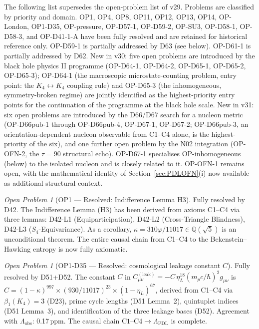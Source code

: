 \documentclass[11pt,a4paper]{article}
\theoremstyle{plain}
\theoremstyle{definition}
\theoremstyle{remark}
\newtheorem{openproblem}[theorem]{Open Problem}
\begin{document}
The following list supersedes the open-problem list of v29. Problems are classified by priority and domain. OP1, OP4, OP8, OP11, OP12, OP13, OP14, OP-London, OP1-D35, OP-pressure, OP-D57-1, OP-D59-2, OP-SU3, OP-D58-1, OP-D58-3, and OP-D41-1-A have been fully resolved and are retained for historical reference only. OP-D59-1 is partially addressed by D63 (see below). OP-D61-1 is partially addressed by D62. New in v30: five open problems are introduced by the black hole physics II programme (OP-D64-1, OP-D64-2, OP-D65-1, OP-D65-2, OP-D65-3); OP-D64-1 (the macroscopic microstate-counting problem, entry point: the $K_4\leftrightarrow K_4$ coupling rule) and OP-D65-3 (the inhomogeneous, symmetry-broken regime) are jointly identified as the highest-priority entry points for the continuation of the programme at the black hole scale. New in v31: six open problems are introduced by the D66/D67 search for a nucleon metric (OP-D66pub-1 through OP-D66pub-4, OP-D67-1, OP-D67-2; OP-D66pub-3, an orientation-dependent nucleon observable from C1--C4 alone, is the highest-priority of the six), and one further open problem by the N02 integration (OP-OFN-2, the $\tau=90$ structural echo). OP-D67-1 specialises OP-inhomogeneous (below) to the isolated nucleon and is closely related to it. OP-OFN-1 remains open, with the mathematical identity of Section~\ref{sec:PDLOFN}(i) now available as additional structural context.

\begin{openproblem}[OP1 --- Resolved: Indifference Lemma H3]
\label{op:H3}
\textcolor{proofblue}{Fully resolved by D42.} The Indifference Lemma (H3) has been derived from axioms C1--C4 via three lemmas: D42-L1 (Equiparticipation), D42-L2 (Cross-Triangle Blindness), D42-L3 ($S_4$-Equivariance). As a corollary, $\kappa=310\varphi/11017\in\mathbb{Q}(\sqrt{5})$ is an unconditional theorem. The entire causal chain from C1--C4 to the Bekenstein--Hawking entropy is now fully axiomatic.
\end{openproblem}

\begin{openproblem}[OP1-D35 --- Resolved: cosmological leakage constant $C$]
\label{op:leakconstant}
\textcolor{proofblue}{Fully resolved by D51+D52.} The constant $C$ in $C^{(\mathrm{leak})}_{\mu\nu}=-C\,\eta_L^{18}(m_p c/\hbar)^2 g_{\mu\nu}$ is $C=(1-\kappa)^{997}\times(930/11017)^{23}\times(1-\eta_L)^{67}$, derived from C1--C4 via $\beta_1(K_4)=3$ (D23), prime cycle lengths (D51 Lemma~2), quintuplet indices (D51 Lemma~3), and identification of the three leakage bases (D52). Agreement with $\Lambda_{\mathrm{obs}}$: 0.17\,ppm. The causal chain $\mathrm{C1\text{--}C4}\to\Lambda_{\mathrm{PDL}}$ is complete.
\end{openproblem}
\end{document}
